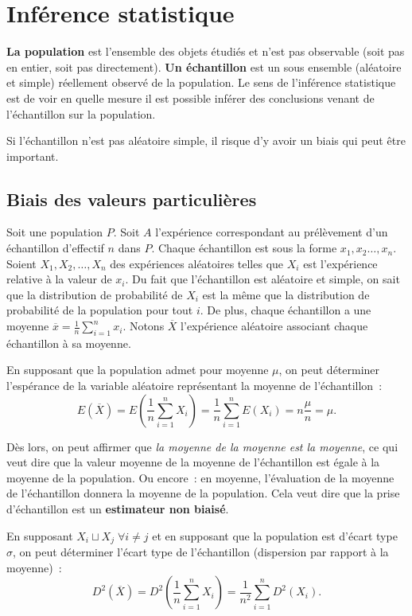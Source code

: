 \documentclass{article}
\begin{document}
\section{Inférence statistique}
	\textbf{La population} est l'ensemble des objets étudiés et n'est pas observable (soit pas en entier, soit pas directement). \textbf{Un échantillon} est un sous
	ensemble (aléatoire et simple) réellement observé de la population. Le sens de l'inférence statistique est de voir en quelle mesure il est possible inférer des
	conclusions venant de l'échantillon sur la population.

	Si l'échantillon n'est pas aléatoire simple, il risque d'y avoir un biais qui peut être important.

	\subsection{Biais des valeurs particulières}
		Soit une population $P$. Soit $A$ l'expérience correspondant au prélèvement d'un échantillon d'effectif $n$ dans $P$. Chaque échantillon est sous la forme
		$x_1, x_2 \ldots, x_n$. Soient $X_1, X_2, \ldots, X_n$ des expériences aléatoires telles que $X_i$ est l'expérience relative à la valeur de $x_i$. Du fait que
		l'échantillon est aléatoire et simple, on sait que la distribution de probabilité de $X_i$ est la même que la distribution de probabilité de la population pour
		tout $i$. De plus, chaque échantillon a une moyenne $\overline x = \frac 1n\sum_{i=1}^nx_i$. Notons $\overline X$ l'expérience aléatoire associant chaque
		échantillon à sa moyenne.

		En supposant que la population admet pour moyenne $\mu$, on peut déterminer l'espérance de la variable aléatoire représentant la moyenne de l'échantillon~:
		\[E(\overline X) = E\left(\frac 1n\sum_{i=1}^nX_i\right) = \frac 1n\sum_{i=1}^nE(X_i) = n\frac \mu n = \mu.\]

		Dès lors, on peut affirmer que \textit{la moyenne de la moyenne est la moyenne}, ce qui veut dire que la valeur moyenne de la moyenne de l'échantillon est égale
		à la moyenne de la population. Ou encore~: en moyenne, l'évaluation de la moyenne de l'échantillon donnera la moyenne de la population. Cela veut dire que la
		prise d'échantillon est un \textbf{estimateur non biaisé}.

		En supposant $X_i \sqcup X_j \; \forall i \neq j$ et en supposant que la population est d'écart type $\sigma$, on peut déterminer l'écart type de l'échantillon
		(dispersion par rapport à la moyenne)~:
		\[D^2(\overline X) = D^2\left(\frac 1n\sum_{i=1}^nX_i\right) = \frac 1{n^2}\sum_{i=1}^nD^2(X_i).\]
\end{document}
